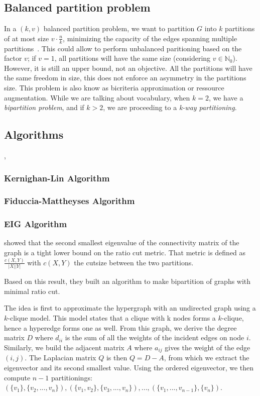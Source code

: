 \documentclass[12pt,a4paper]{article}
\theoremstyle{customdef}
\begin{document}
\subsection{Balanced partition problem}
In a $(k, v)$ balanced partition problem, we want to partition $G$ into $k$ partitions of at most size $v\cdot\frac{n}{k}$, minimizing the capacity of the edges spanning multiple partitions~\cite{Andreev:2004:BGP:1007912.1007931}.
This could allow to perform unbalanced paritioning based on the factor $v$; if $v = 1$, all partitions will have the same size (considering $v \in \mathbb{N}_0$).
However, it is still an upper bound, not an objective.
All the partitions will have the same freedom in size, this does not enforce an asymmetry in the partitions size.
This problem is also know as bicriteria approximation or ressource augmentation.
While we are talking about vocabulary, when $k=2$, we have a \textit{bipartition problem}, and if $k>2$, we are proceeding to a \textit{k-way partitioning}.

\subsection{Algorithms}
\cite{SungKyuLim:ECE6133:partitioning}, \cite{Lim2008}
\subsubsection{Kernighan-Lin Algorithm~\citep*{Kernighan1970}}

\subsubsection{Fiduccia-Mattheyses Algorithm~\citep*{Fiduccia1982}}

\subsubsection{EIG Algorithm~\citep*{Hagen1992}}
\citet{Hagen1992} showed that the second smallest eigenvalue of the connectivity matrix of the graph is a tight lower bound on the ratio cut metric.
That metric is defined as $\frac{c(X,Y)}{|X||Y|}$ with $c(X, Y)$ the cutsize between the two partitions.

Based on this result, they built an algorithm to make bipartition of graphs with minimal ratio cut.

The idea is first to approximate the hypergraph with an undirected graph using a $k$-clique model.
This model states that a clique with k nodes forms a $k$-clique, hence a hyperedge forms one as well.
From this graph, we derive the degree matrix $D$ where  $d_{ii}$ is the sum of all the weights of the incident edges on node $i$.
Similarly, we build the adjacent matrix $A$ where $a_{ij}$ gives the weight of the edge $(i, j)$.
The Laplacian matrix $Q$ is then $Q = D - A$, from which we extract the eigenvector and its second smallest value.
Using the ordered eigenvector, we then compute $n-1$ partitionings: $(\{v_1\}, \{v_2, ..., v_n\}), (\{v_1, v_2\}, \{v_3, ..., v_n\}), ..., (\{v_1, ..., v_{n-1}\}, \{v_n\})$.
\end{document}
